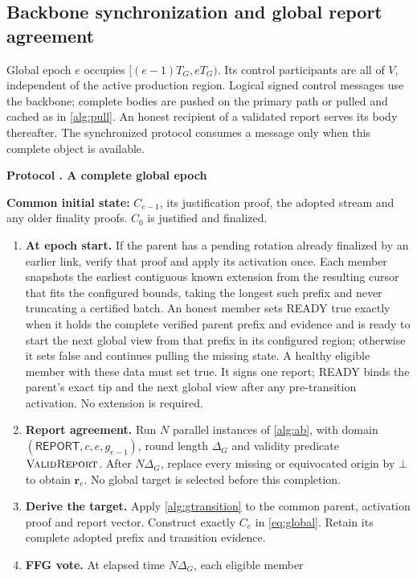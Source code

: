 \documentclass[11pt,a4paper,onecolumn]{article}
\newcommand{\botv}{\bot}
\newcommand{\Tag}[1]{\mathsf{#1}}
\newcommand{\Proc}[1]{\textnormal{\textsc{#1}}}
\theoremstyle{remark}\newtheorem{example}[definition]{Example}
\newcounter{protocol}
\newenvironment{protocol}[2]{\refstepcounter{protocol}\label{#1}\begin{mdframed}[nobreak=true,linewidth=.6pt,skipabove=10pt,skipbelow=10pt,innertopmargin=8pt,innerbottommargin=8pt]\small\raggedright\noindent\textbf{Protocol \theprotocol. #2}\par\smallskip}{\end{mdframed}}
\begin{document}
\subsection{Backbone synchronization and global report agreement}\label{sec:global}
Global epoch $e$ occupies $[(e-1)T_G,eT_G)$. Its control participants are all of
$V$, independent of the active production region. Logical signed control
messages use the backbone; complete bodies are pushed on the primary path or
pulled and cached as in \cref{alg:pull}. An honest recipient of a validated
report serves its body thereafter. The synchronized protocol consumes a message
only when this complete object is available.

\begin{protocol}{alg:global}{A complete global epoch}
\textbf{Common initial state:} $C_{e-1}$, its justification proof, the adopted
stream and any older finality proofs. $C_0$ is justified and finalized.
\begin{enumerate}[label=\textbf{G\arabic*.}]
\item \textbf{At epoch start.} If the parent has a pending rotation already
finalized by an earlier link, verify that proof and apply its activation once.
Each member snapshots the earliest contiguous known extension from the resulting
cursor that fits the configured bounds, taking the longest such prefix and
never truncating a certified batch. An honest member sets READY true exactly
when it holds the complete verified parent prefix and evidence and is ready
to start the next global view from that prefix in its configured region;
otherwise it sets false and
continues pulling the missing state. A healthy eligible member with these data
must set true. It signs one report; READY binds the parent's exact tip and
the next global view after any pre-transition activation. No extension is required.
\item \textbf{Report agreement.} Run $N$ parallel instances of
\cref{alg:ab}, with domain $(\Tag{REPORT},c,e,g_{e-1})$, round length $\Delta_G$
and validity predicate $\Proc{ValidReport}$. After $N\Delta_G$, replace every
missing or equivocated origin by $\botv$ to obtain $\mathbf r_e$.
No global target is selected before this completion.
\item \textbf{Derive the target.} Apply \cref{alg:gtransition} to the common
parent, activation proof and report vector. Construct exactly $C_e$ in
\eqref{eq:global}. Retain its complete adopted prefix and transition evidence.
\item \textbf{FFG vote.} At elapsed time $N\Delta_G$, each eligible member

\end{enumerate}
\end{protocol}
\end{document}

